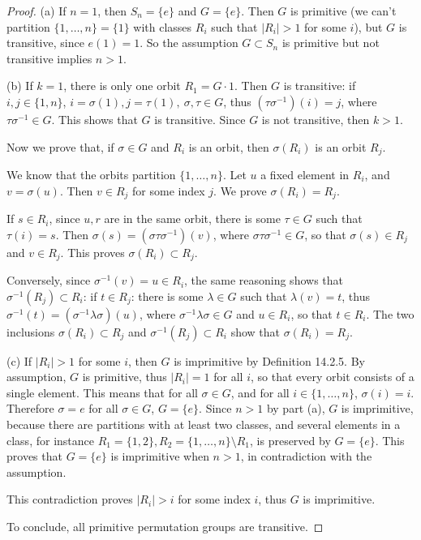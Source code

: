 \documentclass[11pt,a4paper]{article}
\begin{document}
 \begin{proof}

 \item[(a)] If $n = 1$, then $S_n=\{e\}$ and $G = \{e\}$. Then $G$ is primitive (we can't partition $\{1,\ldots,n\} = \{1\}$ with classes $R_i$ such that $|R_i|>1$ for some $i$), but $G$ is transitive, since $e(1) = 1$. So the assumption $G \subset S_n$ is primitive but not transitive implies $n>1$.
 \item[(b)] If $k=1$, there is only one orbit $R_1 = G\cdot 1$. Then $G$ is transitive: if $i,j \in \{1,n\}$, $i = \sigma(1), j = \tau(1),\ \sigma, \tau \in G$, thus $(\tau \sigma^{-1})(i) = j$, where $\tau \sigma^{-1} \in G$. This shows that $G$ is transitive. Since $G$ is not transitive, then $k>1$.
 
 
 Now we prove that, if $\sigma \in G$ and $R_i$ is an orbit, then $\sigma(R_i)$ is an orbit $R_j$.
 
 We know that the orbits partition $\{1,\ldots,n\}$. Let $u$ a fixed element in $R_i$, and $v = \sigma(u)$. Then $v \in R_j$ for some index $j$.  We prove $\sigma(R_i) = R_j$.
 
 If $s \in R_i$, since $u,r$ are in the same orbit, there is some $\tau \in G$ such that $\tau(i) = s$. Then $\sigma(s) = (\sigma \tau \sigma^{-1})(v)$, where $\sigma \tau \sigma^{-1} \in G$, so that $\sigma(s) \in R_j$ and $v \in R_j$. This proves $\sigma(R_i) \subset R_j$. 
 
 Conversely, since $\sigma^{-1}(v) = u \in R_i$, the same reasoning shows that $\sigma^{-1}(R_j) \subset R_i$: if $t \in R_j$: there is some $\lambda \in G$ such that $\lambda(v) = t$, thus $\sigma^{-1}(t) = (\sigma^{-1} \lambda \sigma)(u)$, where $\sigma^{-1} \lambda \sigma \in G$ and $u \in R_i$, so that $t \in R_i$. The two inclusions $\sigma(R_i) \subset R_j$ and $\sigma^{-1}(R_j) \subset R_i$ show that $\sigma(R_i) = R_j$.
 
 \item[(c)] If $|R_i|>1$ for some $i$, then $G$ is imprimitive by Definition 14.2.5. By assumption, $G$ is primitive, thus $|R_i| = 1$ for all $i$, so that every orbit consists of a single element. This means that for all $\sigma \in G$, and for all $i \in \{1,\ldots,n\}$, $\sigma(i) = i$. Therefore $\sigma = e$ for all $\sigma \in G$, $G = \{e\}$. Since $n>1$ by part (a), 
 $G$ is imprimitive, because there are partitions with at least two classes, and several elements in a class, for instance $R_1 = \{1,2\},R_2 =\{1,\ldots,n\} \setminus R_1$, is preserved by $G = \{e\}$. This proves that $G = \{e\}$ is imprimitive when $n>1$, in contradiction with the assumption.
 
This contradiction proves $|R_i|>i$ for some index $i$, thus $G$ is imprimitive.
 
 To conclude, all primitive permutation groups are transitive.
 \end{proof}
 
\end{document}
